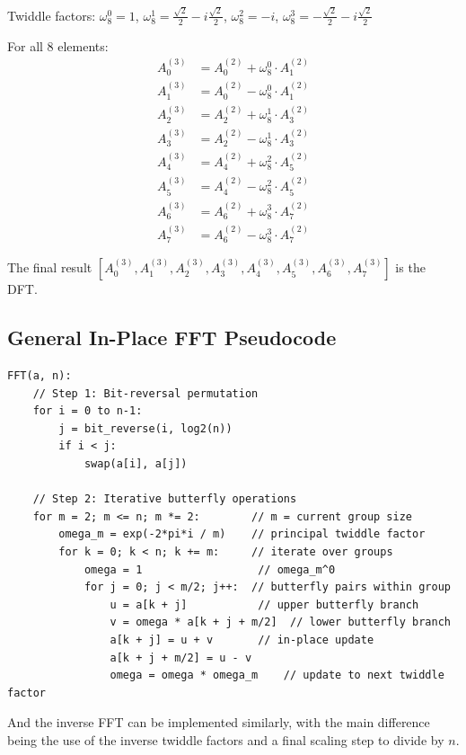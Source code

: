 \documentclass[a4paper]{article}
\theoremstyle{definition}
\begin{document}
Twiddle factors: $\omega_8^0 = 1$, $\omega_8^1 = \frac{\sqrt{2}}{2} - i\frac{\sqrt{2}}{2}$, $\omega_8^2 = -i$, $\omega_8^3 = -\frac{\sqrt{2}}{2} - i\frac{\sqrt{2}}{2}$

For all 8 elements:
\begin{align*}
A_0^{(3)} &= A_0^{(2)} + \omega_8^0 \cdot A_1^{(2)} \\
A_1^{(3)} &= A_0^{(2)} - \omega_8^0 \cdot A_1^{(2)} \\
A_2^{(3)} &= A_2^{(2)} + \omega_8^1 \cdot A_3^{(2)} \\
A_3^{(3)} &= A_2^{(2)} - \omega_8^1 \cdot A_3^{(2)} \\
A_4^{(3)} &= A_4^{(2)} + \omega_8^2 \cdot A_5^{(2)} \\
A_5^{(3)} &= A_4^{(2)} - \omega_8^2 \cdot A_5^{(2)} \\
A_6^{(3)} &= A_6^{(2)} + \omega_8^3 \cdot A_7^{(2)} \\
A_7^{(3)} &= A_6^{(2)} - \omega_8^3 \cdot A_7^{(2)}
\end{align*}

The final result $[A_0^{(3)}, A_1^{(3)}, A_2^{(3)}, A_3^{(3)}, A_4^{(3)}, A_5^{(3)}, A_6^{(3)}, A_7^{(3)}]$ is the DFT.

\subsection{General In-Place FFT Pseudocode}

\begin{verbatim}
FFT(a, n):
    // Step 1: Bit-reversal permutation
    for i = 0 to n-1:
        j = bit_reverse(i, log2(n))
        if i < j:
            swap(a[i], a[j])

    // Step 2: Iterative butterfly operations
    for m = 2; m <= n; m *= 2:        // m = current group size
        omega_m = exp(-2*pi*i / m)    // principal twiddle factor
        for k = 0; k < n; k += m:     // iterate over groups
            omega = 1                  // omega_m^0
            for j = 0; j < m/2; j++:  // butterfly pairs within group
                u = a[k + j]           // upper butterfly branch
                v = omega * a[k + j + m/2]  // lower butterfly branch
                a[k + j] = u + v       // in-place update
                a[k + j + m/2] = u - v
                omega = omega * omega_m    // update to next twiddle factor
\end{verbatim}

And the inverse FFT can be implemented similarly, with the main difference being
the use of the inverse twiddle factors and a final scaling step to divide by \( n \).
\end{document}
